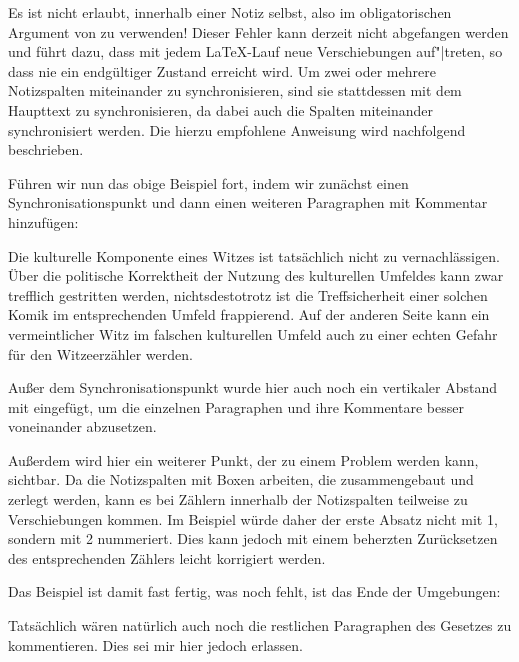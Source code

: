 Es ist nicht erlaubt,  innerhalb
einer Notiz selbst, also im obligatorischen Argument von
 zu verwenden! Dieser Fehler kann derzeit
nicht abgefangen werden und führt dazu, dass mit jedem \LaTeX-Lauf neue
Verschiebungen auf"|treten, so dass nie ein endgültiger Zustand erreicht
wird. Um zwei oder mehrere Notizspalten miteinander zu synchronisieren, sind
sie stattdessen mit dem Haupttext zu synchronisieren, da dabei auch die
Spalten miteinander synchronisiert werden. Die hierzu empfohlene Anweisung
wird nachfolgend beschrieben.%
%
\begin{Example}
  Führen wir nun das obige Beispiel fort, indem wir zunächst einen
  Synchronisationspunkt und dann einen weiteren Paragraphen
  mit Kommentar hinzufügen:
\begin{lstcode}
    \syncwithnotecolumn[paragraphs]\bigskip
    Die kulturelle Komponente eines Witzes ist 
    tatsächlich nicht zu vernachlässigen. Über die
    politische Korrektheit der Nutzung des
    kulturellen Umfeldes kann zwar trefflich 
    gestritten werden, nichtsdestotrotz ist die 
    Treffsicherheit einer solchen Komik im
    entsprechenden Umfeld frappierend. Auf der 
    anderen Seite kann ein vermeintlicher Witz im
    falschen kulturellen Umfeld auch zu einer 
    echten Gefahr für den Witzeerzähler werden.
\end{lstcode}
  Außer dem Synchronisationspunkt wurde hier auch noch ein vertikaler
  Abstand mit  eingefügt, um die einzelnen Paragraphen und ihre
  Kommentare besser voneinander abzusetzen.

  Außerdem wird hier ein weiterer Punkt, der zu einem
  Problem werden kann, sichtbar. Da die Notizspalten mit Boxen arbeiten, die
  zusammengebaut und zerlegt werden, kann es bei Zählern innerhalb der Notizspalten teilweise zu Verschiebungen
  kommen. Im Beispiel würde daher der erste Absatz nicht mit 1, sondern mit 2
  nummeriert. Dies kann jedoch mit einem beherzten Zurücksetzen des
  entsprechenden Zählers leicht korrigiert werden.

  Das Beispiel ist damit fast fertig, was noch fehlt, ist das Ende der
  Umgebungen:
\begin{lstcode}
  \end{addmargin}
  
\end{lstcode}
  Tatsächlich wären natürlich auch noch die restlichen Paragraphen des
  Gesetzes zu kommentieren. Dies sei mir hier jedoch erlassen.
\end{Example}%
